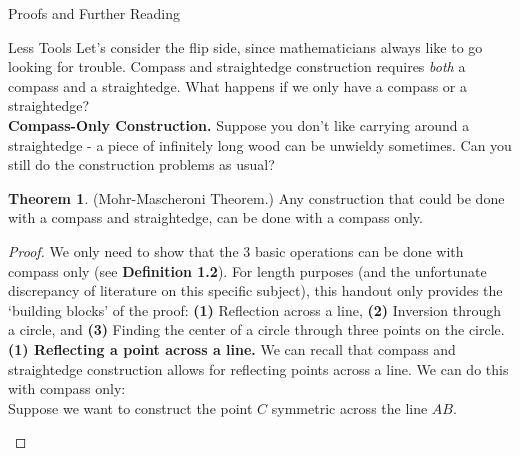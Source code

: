 \documentclass[12pt]{article}
\theoremstyle{definition}
\theoremstyle{definition}
\theoremstyle{definition}
\newtheorem{theorem}{Theorem}[section]
\theoremstyle{definition}
\theoremstyle{definition}
\theoremstyle{definition}
\theoremstyle{definition}
\begin{document}
\begin{section}{Proofs and Further Reading}
    \begin{subsection}{Less Tools}
        Let's consider the flip side, since mathematicians always like to go looking for trouble. Compass and straightedge construction requires \textit{both}
        a compass and a straightedge. What happens if we only have a compass or a straightedge?\\
        \break
        \noindent\textbf{Compass-Only Construction.} Suppose you don't like carrying around a straightedge - a piece of infinitely long wood can be unwieldy 
        sometimes. Can you still do the construction problems as usual? 
        \begin{theorem}{(Mohr-Mascheroni Theorem.)}
            Any construction that could be done with a compass and straightedge, can be done with a compass only.
            \begin{proof}
                We only need to show that the 3 basic operations can be done with compass only (see \textbf{Definition 1.2}). For length purposes (and the 
                unfortunate discrepancy of literature on this specific subject), this handout only provides the `building blocks' of the proof: \textbf{(1)} Reflection 
                across a line, \textbf{(2)} Inversion through a circle, and \textbf{(3)} Finding the center of a circle through three points on the circle.\\
                \break
                \noindent\textbf{(1) Reflecting a point across a line.} We can recall that compass and straightedge construction allows for reflecting points across a line.
                We can do this with compass only:\\
                \noindent Suppose we want to construct the point \(C\) symmetric across the line \(AB\).
                \begin{figure}[H]
                    \centering
\end{figure}
\end{proof}
\end{theorem}
\end{subsection}
\end{section}
\end{document}
